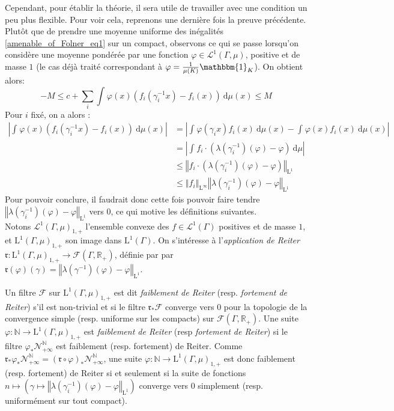 \documentclass[a4paper,12pt]{article}
\newcommand{\R}{\mathbb{R}}
\newcommand{\N}{\mathbb{N}}
\newcommand{\norm}[1]{\left\Vert #1\right\Vert}
\newcommand{\abs}[1]{\left\vert#1\right\vert}
\newcommand{\indic}{\mathbbm{1}}
\newcommand{\integral}[4]{\int_{#1}^{#2} #3~\mathrm{d}#4}
\newcommand{\ssi}{si et seulement si }
\newcommand{\inv}{^{-1}}
\newcommand{\comp}{\circ}
\newcommand{\nhds}{\mathcal{N}}
\begin{document}
Cependant, pour établir la théorie, il sera utile de travailler avec une condition un peu plus flexible. Pour voir cela, reprenons une dernière fois la preuve
précédente. Plutôt que de prendre une moyenne uniforme des inégalités \ref{amenable_of_Folner_eq1} sur un compact, observons ce qui se passe 
lorsqu'on considère une moyenne pondérée par une fonction $\varphi\in\mathscr{L}^1(\Gamma, \mu)$, positive et de masse $1$ (le cas déjà traité correspondant à $\varphi=\frac1{\mu(K)}\indic_K$).
On obtient alors:
\begin{equation*}\label{intuition_Reiter_eq1}
    -M \le c + \sum_i \integral{}{}{\varphi(x)\left(f_i(\gamma_i\inv x) - f_i(x)\right)}{\mu(x)} \le M
\end{equation*}
Pour $i$ fixé, on a alors :
\begin{align*}
    \abs{\integral{}{}{\varphi(x)(f_i(\gamma_i\inv x) - f_i(x))}{\mu(x)}} 
        &= \abs{\integral{}{}{\varphi(\gamma_i x)f_i(x)}{\mu(x)} - \integral{}{}{\varphi(x) f_i(x)}{\mu(x)}} \\
        &= \abs{\integral{}{}{f_i\cdot\left(\lambda(\gamma_i\inv)(\varphi)-\varphi\right)}{\mu}} \\
        &\le \norm{f_i\cdot\left(\lambda(\gamma_i\inv)(\varphi)-\varphi\right)}_{\mathrm{L}^1} \\
        &\le \norm{f_i}_{\mathrm{L}^\infty} \norm{\lambda(\gamma_i\inv)(\varphi)-\varphi}_{\mathrm{L}^1}
\end{align*}
Pour pouvoir conclure, il faudrait donc cette fois pouvoir faire tendre $\norm{\lambda(\gamma_i\inv)(\varphi)-\varphi}_{\mathrm{L}^1}$ vers $0$, ce qui motive les définitions suivantes.\\

Notons $\mathscr{L}^1(\Gamma, \mu)_{1,+}$ l'ensemble convexe des $f\in\mathscr{L}^1(\Gamma)$ positives et de masse $1$, et $\mathrm{L}^1(\Gamma, \mu)_{1, +}$ son image dans 
$\mathrm{L}^1(\Gamma)$. On s'intéresse à l'\emph{application de Reiter} $\mathfrak{r} : \mathrm{L}^1(\Gamma, \mu)_{1, +}\to\mathcal{F}(\Gamma, \R_+)$, définie par
par $\mathfrak{r}(\varphi)(\gamma) = \norm{\lambda(\gamma\inv)(\varphi)-\varphi}_{\mathrm{L}^1}$.

Un filtre $\mathscr{F}$ sur $\mathrm{L}^1(\Gamma, \mu)_{1, +}$ est dit \emph{faiblement de Reiter} (resp. \emph{fortement de Reiter}) s'il est non-trivial et si le filtre $\mathfrak{r}_*\mathscr{F}$ converge vers $0$ pour la 
topologie de la convergence simple (resp. uniforme sur les compacts) sur $\mathcal{F}(\Gamma, \R_+)$. 
Une suite $\varphi:\N\to\mathrm{L}^1(\Gamma, \mu)_{1, +}$ est \emph{faiblement de Reiter} (resp \emph{fortement de Reiter}) si le filtre $\varphi_*\nhds_{+\infty}^\N$ est faiblement (resp. fortement) de Reiter. Comme $\mathfrak{r}_*\varphi_*\nhds_{+\infty}^\N = (\mathfrak{r}\comp \varphi)_*\nhds_{+\infty}^\N$,
une suite $\varphi:\N\to\mathrm{L}^1(\Gamma, \mu)_{1, +}$ est donc faiblement (resp. fortement) de Reiter \ssi la suite de fonctions
$n\mapsto\left(\gamma\mapsto\norm{\lambda(\gamma_i\inv)(\varphi)-\varphi}_{\mathrm{L}^1}\right)$ converge vers $0$ simplement 
(resp. uniformément sur tout compact).
\end{document}
